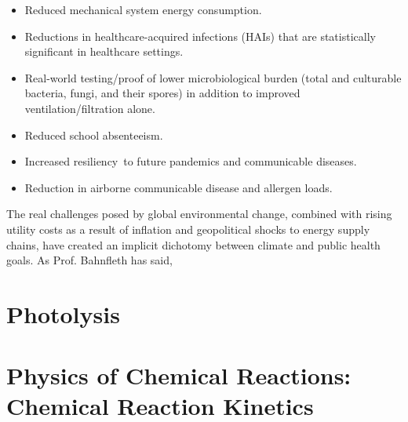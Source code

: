 \begin{itemize}
\item Reduced mechanical system energy consumption.
\item Reductions in healthcare-acquired infections (HAIs) that are statistically significant in healthcare settings.
\item Real-world testing/proof of lower microbiological burden (total and culturable bacteria, fungi, and their spores) in addition to improved ventilation/filtration alone.
\item Reduced school absenteeism.
\item Increased resiliency to future pandemics and communicable diseases.
\item Reduction in airborne communicable disease and allergen loads.
\end{itemize}



The real challenges posed by global environmental change, combined with rising utility costs as a result of inflation and geopolitical shocks to energy supply chains, have created an implicit dichotomy between climate and public health goals. As Prof. Bahnfleth has said,

\section{Photolysis}


\section{Physics of Chemical Reactions: Chemical Reaction Kinetics}

